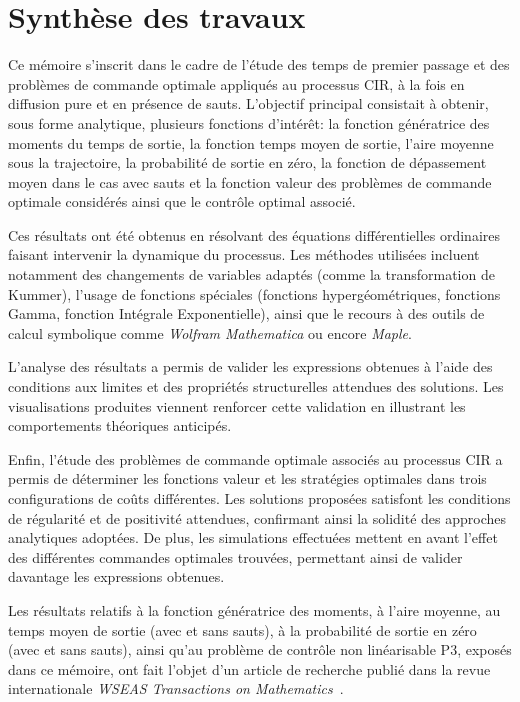 \label{sec:Conclusion}
\section{Synthèse des travaux}

Ce mémoire s'inscrit dans le cadre de l'étude des temps de premier passage et des problèmes de commande optimale appliqués au processus \acs{CIR}, à la fois en diffusion pure et en présence de sauts. L'objectif principal consistait à obtenir, sous forme analytique, plusieurs fonctions d'intérêt: la fonction génératrice des moments du temps de sortie, la fonction temps moyen de sortie, l'aire moyenne sous la trajectoire, la probabilité de sortie en zéro, la fonction de dépassement moyen dans le cas avec sauts et la fonction valeur des problèmes de commande optimale considérés ainsi que le contrôle optimal associé.

Ces résultats ont été obtenus en résolvant des équations différentielles ordinaires faisant intervenir la dynamique du processus. Les méthodes utilisées incluent notamment des changements de variables adaptés (comme la transformation de Kummer), l'usage de fonctions spéciales (fonctions hypergéométriques, fonctions Gamma, fonction Intégrale Exponentielle), ainsi que le recours à des outils de calcul symbolique comme \textit{Wolfram Mathematica} ou encore \textit{Maple}.

L'analyse des résultats a permis de valider les expressions obtenues à l'aide des conditions aux limites et des propriétés structurelles attendues des solutions. Les visualisations produites viennent renforcer cette validation en illustrant les comportements théoriques anticipés.

Enfin, l'étude des problèmes de commande optimale associés au processus \acs{CIR} a permis de déterminer les fonctions valeur et les stratégies optimales dans trois configurations de coûts différentes. Les solutions proposées satisfont les conditions de régularité et de positivité attendues, confirmant ainsi la solidité des approches analytiques adoptées. De plus, les simulations effectuées mettent en avant l'effet des différentes commandes optimales trouvées, permettant ainsi de valider davantage les expressions obtenues.

Les résultats relatifs à la fonction génératrice des moments, à l'aire moyenne, au temps moyen de sortie (avec et sans sauts), à la probabilité de sortie en zéro (avec et sans sauts), ainsi qu'au problème de contrôle non linéarisable P3, exposés dans ce mémoire, ont fait l'objet d'un article de recherche publié dans la revue internationale \textit{WSEAS Transactions on Mathematics}~\cite{lefebvre2025}.


